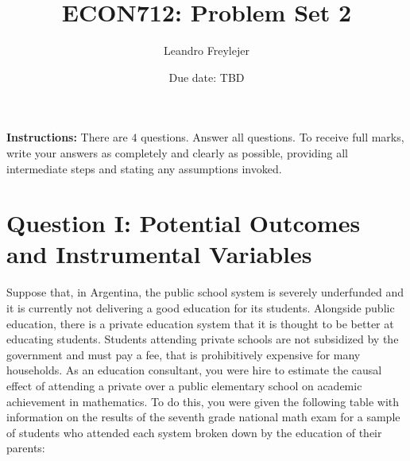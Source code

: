 \documentclass[letterpaper,12pt]{article}
\title{\vspace{-.5in} ECON712: Problem Set 2}
\author{Leandro Freylejer}
\date{Due date: TBD}
\begin{document}

\maketitle
\vspace{-.3in}
\textbf{Instructions:} There are $4$ questions. Answer all questions. To receive full marks, write your answers as completely and clearly as possible, providing all intermediate steps and stating any assumptions invoked.


\section*{Question I: Potential Outcomes and Instrumental Variables}
Suppose that, in Argentina, the public school system is severely underfunded and it is currently not delivering a good education for its students. Alongside public education, there is a private education system that it is thought to be better at educating students. Students attending private schools are not subsidized by the government and must pay a fee, that is prohibitively expensive for many households. As an education consultant, you were hire to estimate the causal effect of attending a private over a public elementary school on academic achievement in mathematics. To do this, you were given the following table with information on the results of the seventh grade national math exam for a sample of students who attended each system broken down by the education of their parents:      
\end{document}
